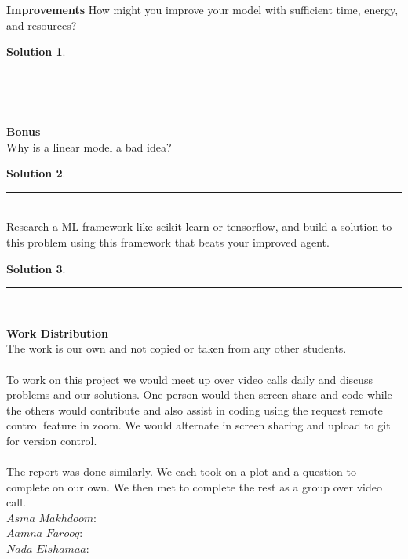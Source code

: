\documentclass{article}
\theoremstyle{definition}
\def\fline{\rule{0.75\linewidth}{0.5pt}}
\newcommand{\finishline}{\vspace{-15pt}\begin{center}\fline\end{center}}
\newtheorem*{solution*}{Solution}
\newenvironment{solution}{\begin{solution*}}{{\finishline} \end{solution*}}
\begin{document}
    \textbf{Improvements}
        How might you improve your model with sufficient time, energy, and resources?
        \begin{solution} \hfill \\
    
        \end{solution}\\\\
\smallskip

\textbf{\Large Bonus} \\
    Why is a linear model a bad idea? 
    \begin{solution} \hfill \\
    
    \end{solution}\\
    
    Research a ML framework like scikit-learn or tensorflow, and build a solution to this problem using this framework that beats your improved agent.
    \begin{solution} \hfill \\
    
    \end{solution}\\

\smallskip   

\textbf{Work Distribution}
\\
The work is our own and not copied or taken from any other students. 
\\\\
To work on this project we would meet up over video calls daily and discuss problems and our solutions. One person would then screen share and code while the others would contribute and also assist in coding using the request remote control feature in zoom. We would alternate in screen sharing and upload to git for version control. 
\\\\
The report was done similarly. We each took on a plot and a question to complete on our own. We then met to complete the rest as a group over video call. 
\\
$Asma$ $Makhdoom:$ 
\\
$Aamna$ $Farooq:$ 
\\
$Nada$ $Elshamaa:$ 
\\
\smallskip
\end{document}
